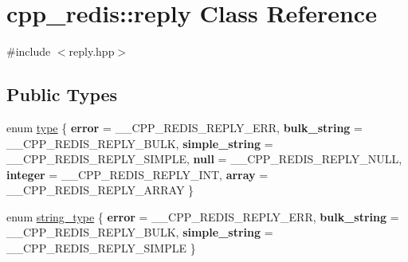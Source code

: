 \hypertarget{classcpp__redis_1_1reply}{}\section{cpp\+\_\+redis\+:\+:reply Class Reference}
\label{classcpp__redis_1_1reply}


{\ttfamily \#include $<$reply.\+hpp$>$}

\subsection*{Public Types}
\begin{DoxyCompactItemize}
\item 
enum \mbox{\hyperlink{classcpp__redis_1_1reply_acc272b2a52164cac1d110c619a0b25bd}{type}} \{ \newline
{\bfseries error} = \+\_\+\+\_\+\+C\+P\+P\+\_\+\+R\+E\+D\+I\+S\+\_\+\+R\+E\+P\+L\+Y\+\_\+\+E\+RR, 
{\bfseries bulk\+\_\+string} = \+\_\+\+\_\+\+C\+P\+P\+\_\+\+R\+E\+D\+I\+S\+\_\+\+R\+E\+P\+L\+Y\+\_\+\+B\+U\+LK, 
{\bfseries simple\+\_\+string} = \+\_\+\+\_\+\+C\+P\+P\+\_\+\+R\+E\+D\+I\+S\+\_\+\+R\+E\+P\+L\+Y\+\_\+\+S\+I\+M\+P\+LE, 
{\bfseries null} = \+\_\+\+\_\+\+C\+P\+P\+\_\+\+R\+E\+D\+I\+S\+\_\+\+R\+E\+P\+L\+Y\+\_\+\+N\+U\+LL, 
\newline
{\bfseries integer} = \+\_\+\+\_\+\+C\+P\+P\+\_\+\+R\+E\+D\+I\+S\+\_\+\+R\+E\+P\+L\+Y\+\_\+\+I\+NT, 
{\bfseries array} = \+\_\+\+\_\+\+C\+P\+P\+\_\+\+R\+E\+D\+I\+S\+\_\+\+R\+E\+P\+L\+Y\+\_\+\+A\+R\+R\+AY
 \}
\item 
enum \mbox{\hyperlink{classcpp__redis_1_1reply_ac192ba4cb8f2bb6e7cb465edf755328b}{string\+\_\+type}} \{ {\bfseries error} = \+\_\+\+\_\+\+C\+P\+P\+\_\+\+R\+E\+D\+I\+S\+\_\+\+R\+E\+P\+L\+Y\+\_\+\+E\+RR, 
{\bfseries bulk\+\_\+string} = \+\_\+\+\_\+\+C\+P\+P\+\_\+\+R\+E\+D\+I\+S\+\_\+\+R\+E\+P\+L\+Y\+\_\+\+B\+U\+LK, 
{\bfseries simple\+\_\+string} = \+\_\+\+\_\+\+C\+P\+P\+\_\+\+R\+E\+D\+I\+S\+\_\+\+R\+E\+P\+L\+Y\+\_\+\+S\+I\+M\+P\+LE
 \}
\end{DoxyCompactItemize}
